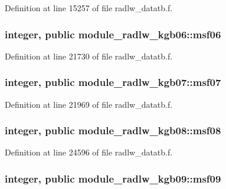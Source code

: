 Definition at line 15257 of file radlw\+\_\+datatb.\+f.

\subsubsection[{\texorpdfstring{msf06}{msf06}}]{\setlength{\rightskip}{0pt plus 5cm}integer, public module\+\_\+radlw\+\_\+kgb06\+::msf06}\hypertarget{group__module__radlw__main_ga65f808aeb87457d383dd7f9366878fb9}{}\label{group__module__radlw__main_ga65f808aeb87457d383dd7f9366878fb9}


Definition at line 21730 of file radlw\+\_\+datatb.\+f.

\subsubsection[{\texorpdfstring{msf07}{msf07}}]{\setlength{\rightskip}{0pt plus 5cm}integer, public module\+\_\+radlw\+\_\+kgb07\+::msf07}\hypertarget{group__module__radlw__main_ga9310f33501467fbadcf092d71559358b}{}\label{group__module__radlw__main_ga9310f33501467fbadcf092d71559358b}


Definition at line 21969 of file radlw\+\_\+datatb.\+f.

\subsubsection[{\texorpdfstring{msf08}{msf08}}]{\setlength{\rightskip}{0pt plus 5cm}integer, public module\+\_\+radlw\+\_\+kgb08\+::msf08}\hypertarget{group__module__radlw__main_ga7db22d5a0ece1b1f10cbf64ae1181a09}{}\label{group__module__radlw__main_ga7db22d5a0ece1b1f10cbf64ae1181a09}


Definition at line 24596 of file radlw\+\_\+datatb.\+f.

\subsubsection[{\texorpdfstring{msf09}{msf09}}]{\setlength{\rightskip}{0pt plus 5cm}integer, public module\+\_\+radlw\+\_\+kgb09\+::msf09}\hypertarget{group__module__radlw__main_ga7d728ef04b3f26c6b20149084334be5a}{}\label{group__module__radlw__main_ga7d728ef04b3f26c6b20149084334be5a}


